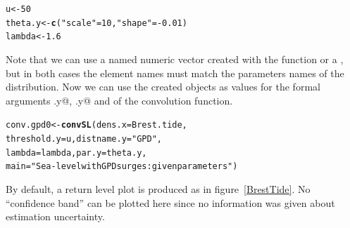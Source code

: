 \documentclass[11pt,a4paper]{report}\usepackage[]{graphicx}\usepackage[]{color}
\makeatletter
\newcommand{\hlnum}[1]{\textcolor[rgb]{0.686,0.059,0.569}{#1}}%
\newcommand{\hlstr}[1]{\textcolor[rgb]{0.192,0.494,0.8}{#1}}%
\newcommand{\hlopt}[1]{\textcolor[rgb]{0,0,0}{#1}}%
\newcommand{\hlstd}[1]{\textcolor[rgb]{0.345,0.345,0.345}{#1}}%
\newcommand{\hlkwb}[1]{\textcolor[rgb]{0.69,0.353,0.396}{#1}}%
\newcommand{\hlkwc}[1]{\textcolor[rgb]{0.333,0.667,0.333}{#1}}%
\newcommand{\hlkwd}[1]{\textcolor[rgb]{0.737,0.353,0.396}{\textbf{#1}}}%
\newenvironment{kframe}{%
 \def\at@end@of@kframe{}%
 \ifinner\ifhmode%
  \def\at@end@of@kframe{\end{minipage}}%
  \begin{minipage}{\columnwidth}%
 \fi\fi%
 \def\FrameCommand##1{\hskip\@totalleftmargin \hskip-\fboxsep
 \colorbox{shadecolor}{##1}\hskip-\fboxsep
     \hskip-\linewidth \hskip-\@totalleftmargin \hskip\columnwidth}%
 \MakeFramed {\advance\hsize-\width
   \@totalleftmargin\z@ \linewidth\hsize
   \@setminipage}}%
 {\par\unskip\endMakeFramed%
 \at@end@of@kframe}
\newenvironment{knitrout}{}{} %
\makeatother
\begin{document}
\begin{knitrout}
\color{fgcolor}\begin{kframe}
\begin{alltt}
\hlstd{u} \hlkwb{<-} \hlnum{50}
\hlstd{theta.y} \hlkwb{<-} \hlkwd{c}\hlstd{(}\hlstr{"scale"} \hlstd{=} \hlnum{10}\hlstd{,} \hlstr{"shape"} \hlstd{=} \hlopt{-}\hlnum{0.01}\hlstd{)}
\hlstd{lambda} \hlkwb{<-} \hlnum{1.6}
\end{alltt}
\end{kframe}
\end{knitrout}

\noindent
Note that we can use a named numeric vector created with the \verb@c@
function or a \verb@list@, but in both cases the element names must
match the parameters names of the distribution.  Now we can use the
created objects as values for the formal arguments \verb@threshold.y@,
 \verb@par.y@ and \verb@lambda@ of the convolution function.

\begin{knitrout}
\color{fgcolor}\begin{kframe}
\begin{alltt}
\hlstd{conv.gpd0} \hlkwb{<-} \hlkwd{convSL}\hlstd{(}\hlkwc{dens.x} \hlstd{= Brest.tide,}
                   \hlkwc{threshold.y} \hlstd{= u,} \hlkwc{distname.y} \hlstd{=} \hlstr{"GPD"}\hlstd{,}
                   \hlkwc{lambda} \hlstd{= lambda,} \hlkwc{par.y} \hlstd{= theta.y,}
                   \hlkwc{main} \hlstd{=} \hlstr{"Sea-level with GPD surges: given parameters"}\hlstd{)}
\end{alltt}
\end{kframe}
\end{knitrout}

\noindent
By default, a return level plot is produced as in figure~\ref{BrestTide}. No ``confidence
band'' can be plotted here since no information was given about 
estimation uncertainty. 
\end{document}
